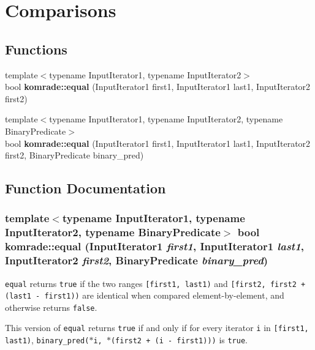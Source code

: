 \section{Comparisons}
\label{group__comparisons}
\subsection*{Functions}
\begin{CompactItemize}
\item 
{\footnotesize template$<$typename InputIterator1, typename InputIterator2$>$ }\\bool {\bf komrade::equal} (InputIterator1 first1, InputIterator1 last1, InputIterator2 first2)
\item 
{\footnotesize template$<$typename InputIterator1, typename InputIterator2, typename BinaryPredicate$>$ }\\bool {\bf komrade::equal} (InputIterator1 first1, InputIterator1 last1, InputIterator2 first2, BinaryPredicate binary\_\-pred)
\end{CompactItemize}


\subsection{Function Documentation}
\subsubsection[equal]{\setlength{\rightskip}{0pt plus 5cm}template$<$typename InputIterator1, typename InputIterator2, typename BinaryPredicate$>$ bool komrade::equal (InputIterator1 {\em first1}, \/  InputIterator1 {\em last1}, \/  InputIterator2 {\em first2}, \/  BinaryPredicate {\em binary\_\-pred})\hspace{0.3cm}{\tt  [inline]}}\label{group__comparisons_g35b161a6a0366676f317c32e133eda36}


{\tt equal} returns {\tt true} if the two ranges {\tt [first1, last1)} and {\tt [first2, first2 + (last1 - first1))} are identical when compared element-by-element, and otherwise returns {\tt false}.

This version of {\tt equal} returns {\tt true} if and only if for every iterator {\tt i} in {\tt [first1, last1)}, {\tt binary\_\-pred($\ast$i, $\ast$(first2 + (i - first1)))} is {\tt true}.

